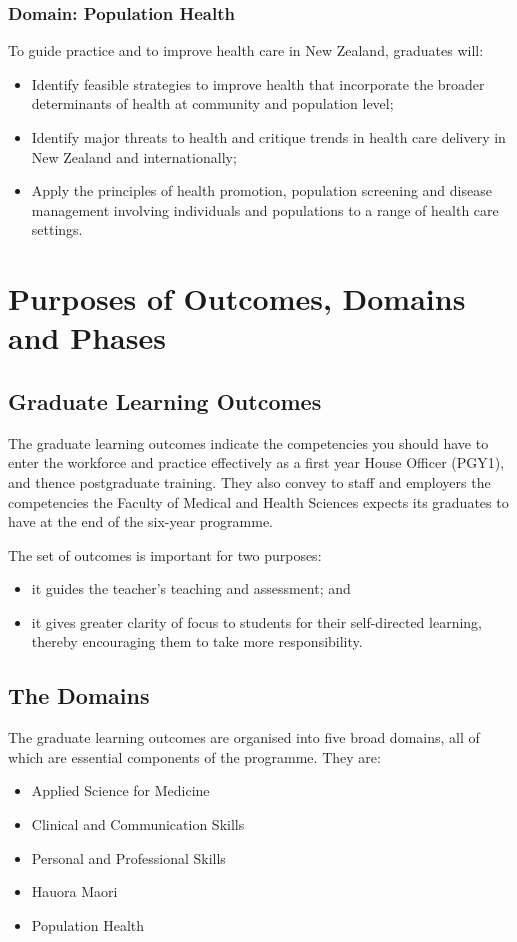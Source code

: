 \documentclass[11pt,fleqn]{book} %
\begin{document}
\subsubsection{Domain: Population Health}
To guide practice and to improve health care in New Zealand, graduates will:
\begin{itemize}
\item Identify feasible strategies to improve health that incorporate the broader determinants of health at community and population level;
\item Identify major threats to health and critique trends in health care delivery in New Zealand and internationally;
\item Apply the principles of health promotion, population screening and disease management involving individuals and populations to a range of health care settings.
\end{itemize}


\section{Purposes of Outcomes, Domains and Phases}

\subsection{Graduate Learning Outcomes}
The graduate learning outcomes indicate the competencies you should have to enter the workforce and practice effectively as a first year House Officer (PGY1), and thence postgraduate training.  They also convey to staff and employers the competencies the Faculty of Medical and Health Sciences expects its graduates to have at the end of the six-year programme.

The set of outcomes is important for two purposes:
\begin{itemize}
\item	it guides the teacher's teaching and assessment; and
\item	it gives greater clarity of focus to students for their self-directed learning, thereby encouraging them to take more responsibility.
\end{itemize}

\subsection{The Domains}

The graduate learning outcomes are organised into five broad domains, all of which are essential components of the programme.  They are:
\begin{itemize}
\item Applied Science for Medicine
\item Clinical and Communication Skills
\item Personal and Professional Skills
\item Hauora Maori
\item Population Health 
\end{itemize}
\end{document}
